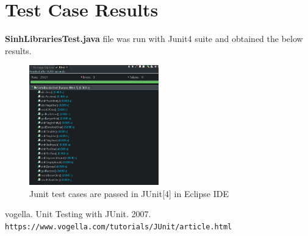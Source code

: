 \documentclass[letterpaper, 11pt]{report}
\begin{document}
\section*{Test Case Results}
\textbf{SinhLibrariesTest.java} file was run with Junit4 suite and obtained the below results.
\\
\begin{figure}[htb]
\includegraphics[width=0.5\textwidth]{TestCases_Review_Results_F3}
\centering
\caption{Junit test cases are passed in JUnit[4] in Eclipse IDE}
\end{figure}
\begin{thebibliography}{}
vogella. Unit Testing with JUnit. 2007. 
\\\texttt{https://www.vogella.com/tutorials/JUnit/article.html}
\end{thebibliography}
\end{document}
